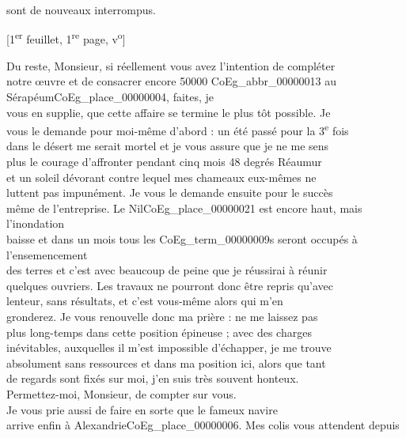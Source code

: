 \documentclass{book}
\begin{document}
sont de nouveaux interrompus.
{\footnotesize\begin{center} {[1\textsuperscript{er} feuillet, 1\textsuperscript{re} page, v\textsuperscript{o}]}\end{center}}
\indent Du reste, Monsieur, si réellement vous avez l’intention de compléter\\
notre œuvre et de consacrer encore 50000 \gls{CoEg_abbr_00000013} au Sérapéum\gls{CoEg_place_00000004}, faites, je\\
vous en supplie, que cette affaire se termine le plus tôt possible. Je\\
vous le demande pour moi-même d’abord : un été passé pour la 3\textsuperscript{e} fois\\
dans le désert me serait mortel et je vous assure que je ne me sens\\
plus le courage d’affronter pendant cinq mois 48 degrés Réaumur\\
et un soleil dévorant contre lequel mes chameaux eux-mêmes ne\\
luttent pas impunément. Je vous le demande ensuite pour le succès\\
même de l’entreprise. Le Nil\gls{CoEg_place_00000021} est encore haut, mais l’inondation\\
baisse et dans un mois tous les \glspl{CoEg_term_00000009} seront occupés à l’ensemencement\\
des terres et c’est avec beaucoup de peine que je réussirai à réunir\\
quelques ouvriers. Les travaux ne pourront donc être repris qu’avec\\
lenteur, sans résultats, et c’est vous-même alors qui m’en\\
gronderez. Je vous renouvelle donc ma prière : ne me laissez pas\\
plus long-temps dans cette position épineuse ; avec des charges\\
inévitables, auxquelles il m’est impossible d’échapper, je me trouve\\
absolument sans ressources et dans ma position ici, alors que tant\\
de regards sont fixés sur moi, j’en suis très souvent honteux.\\
Permettez-moi, Monsieur, de compter sur vous.\\
\indent Je vous prie aussi de faire en sorte que le fameux navire\\
arrive enfin à Alexandrie\gls{CoEg_place_00000006}. Mes colis vous attendent depuis\\
\end{document}
